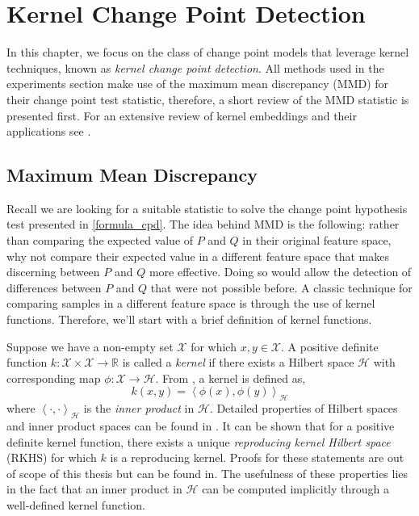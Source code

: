 \chapter{Kernel Change Point Detection}
In this chapter, we focus on the class of change point models that leverage kernel techniques, known as \textit{kernel change point detection}. All methods used in the experiments section make use of the maximum mean discrepancy (MMD) for their change point test statistic, therefore, a short review of the MMD statistic is presented first. For an extensive review of kernel embeddings and their applications see \cite{muandet2017kernel}.

\section{Maximum Mean Discrepancy}
\label{mmd}
Recall we are looking for a suitable statistic to solve the change point hypothesis test presented in \ref{formula_cpd}. The idea behind MMD is the following: rather than comparing the expected value of $P$ and $Q$ in their original feature space, why not compare their expected value in a different feature space that makes discerning between $P$ and $Q$ more effective. Doing so would allow the detection of differences between $P$ and $Q$ that were not possible before. A classic technique for comparing samples in a different feature space is through the use of kernel functions. Therefore, we'll start with a brief definition of kernel functions.

Suppose we have a non-empty set  $\mathcal{X}$ for which $x,y \in \mathcal{X}$. A positive definite function $k: \mathcal{X} \times \mathcal{X} \rightarrow \mathbb{R}$ is called a \textit{kernel} if there exists a Hilbert space $ \mathcal{H}$ with corresponding map $\phi: \mathcal{X} \rightarrow \mathcal{H}$. From \cite{scholkopf2002learning}, a kernel is defined as,
\begin{equation}
\label{kernel}
k(x,y) = \left\langle \phi(x), \phi(y) \right\rangle_\mathcal{H}
\end{equation}
where $\left\langle \cdot, \cdot \right\rangle_\mathcal{H}$ is the \textit{inner product} in $ \mathcal{H}$. Detailed properties of Hilbert spaces and inner product spaces can be found in \cite{young1988introduction}.  It can be shown that for a positive definite kernel function, there exists a unique \textit{reproducing kernel Hilbert space} (RKHS) for which $k$ is a reproducing kernel. Proofs for these statements are out of scope of this thesis but can be found in\cite{scholkopf2002learning}. The usefulness of these properties lies in the fact that an inner product in $ \mathcal{H}$ can be computed implicitly through a well-defined kernel function.

